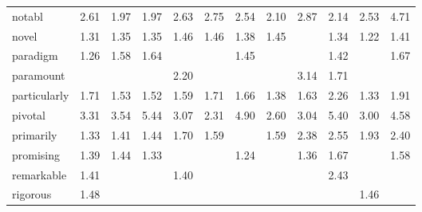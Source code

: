 \begin{tabular}{lrrrrrrrrrrr}
notabl & \cellcolor{blue!52} 2.61 & \cellcolor{blue!39} 1.97 & \cellcolor{blue!39} 1.97 & \cellcolor{blue!52} 2.63 & \cellcolor{blue!55} 2.75 & \cellcolor{blue!50} 2.54 & \cellcolor{blue!42} 2.10 & \cellcolor{blue!57} 2.87 & \cellcolor{blue!42} 2.14 & \cellcolor{blue!50} 2.53 & \cellcolor{blue!94} 4.71 \\
novel & \cellcolor{blue!26} 1.31 & \cellcolor{blue!27} 1.35 & \cellcolor{blue!27} 1.35 & \cellcolor{blue!29} 1.46 & \cellcolor{blue!29} 1.46 & \cellcolor{blue!27} 1.38 & \cellcolor{blue!28} 1.45 &  & \cellcolor{blue!26} 1.34 & \cellcolor{blue!24} 1.22 & \cellcolor{blue!28} 1.41 \\
paradigm & \cellcolor{blue!25} 1.26 & \cellcolor{blue!31} 1.58 & \cellcolor{blue!32} 1.64 &  &  & \cellcolor{blue!28} 1.45 &  &  & \cellcolor{blue!28} 1.42 &  & \cellcolor{blue!33} 1.67 \\
paramount &  &  &  & \cellcolor{blue!44} 2.20 &  &  &  & \cellcolor{blue!62} 3.14 & \cellcolor{blue!34} 1.71 &  &  \\
particularly & \cellcolor{blue!34} 1.71 & \cellcolor{blue!30} 1.53 & \cellcolor{blue!30} 1.52 & \cellcolor{blue!31} 1.59 & \cellcolor{blue!34} 1.71 & \cellcolor{blue!33} 1.66 & \cellcolor{blue!27} 1.38 & \cellcolor{blue!32} 1.63 & \cellcolor{blue!45} 2.26 & \cellcolor{blue!26} 1.33 & \cellcolor{blue!38} 1.91 \\
pivotal & \cellcolor{blue!66} 3.31 & \cellcolor{blue!70} 3.54 & \cellcolor{blue!100} 5.44 & \cellcolor{blue!61} 3.07 & \cellcolor{blue!46} 2.31 & \cellcolor{blue!98} 4.90 & \cellcolor{blue!52} 2.60 & \cellcolor{blue!60} 3.04 & \cellcolor{blue!100} 5.40 & \cellcolor{blue!60} 3.00 & \cellcolor{blue!91} 4.58 \\
primarily & \cellcolor{blue!26} 1.33 & \cellcolor{blue!28} 1.41 & \cellcolor{blue!28} 1.44 & \cellcolor{blue!34} 1.70 & \cellcolor{blue!31} 1.59 &  & \cellcolor{blue!31} 1.59 & \cellcolor{blue!47} 2.38 & \cellcolor{blue!51} 2.55 & \cellcolor{blue!38} 1.93 & \cellcolor{blue!48} 2.40 \\
promising & \cellcolor{blue!27} 1.39 & \cellcolor{blue!28} 1.44 & \cellcolor{blue!26} 1.33 &  &  & \cellcolor{blue!24} 1.24 &  & \cellcolor{blue!27} 1.36 & \cellcolor{blue!33} 1.67 &  & \cellcolor{blue!31} 1.58 \\
remarkable & \cellcolor{blue!28} 1.41 &  &  & \cellcolor{blue!27} 1.40 &  &  &  &  & \cellcolor{blue!48} 2.43 &  &  \\
rigorous & \cellcolor{blue!29} 1.48 &  &  &  &  &  &  &  &  & \cellcolor{blue!29} 1.46 &  \\

\end{tabular}

